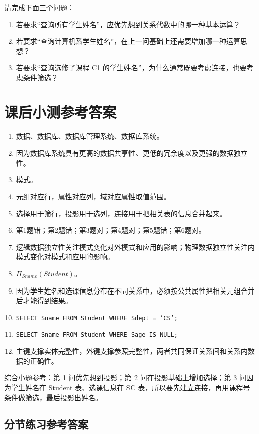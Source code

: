 \documentclass{../../note}
\begin{document}
请完成下面三个问题：

\begin{enumerate}
  \item 若要求“查询所有学生姓名”，应优先想到关系代数中的哪一种基本运算？
  \item 若要求“查询计算机系学生姓名”，在上一问基础上还需要增加哪一种运算思想？
  \item 若要求“查询选修了课程 C1 的学生姓名”，为什么通常既要考虑连接，也要考虑条件筛选？
\end{enumerate}

\section{课后小测参考答案}

\begin{enumerate}
  \item 数据、数据库、数据库管理系统、数据库系统。
  \item 因为数据库系统具有更高的数据共享性、更低的冗余度以及更强的数据独立性。
  \item 模式。
  \item 元组对应行，属性对应列，域对应属性取值范围。
  \item 选择用于筛行，投影用于选列，连接用于把相关表的信息合并起来。
  \item 第1题错；第2题错；第3题对；第4题对；第5题错；第6题对。
  \item 逻辑数据独立性关注模式变化对外模式和应用的影响；物理数据独立性关注内模式变化对模式和应用的影响。
  \item $\Pi_{Sname}(Student)$。
  \item 因为学生姓名和选课信息分布在不同关系中，必须按公共属性把相关元组合并后才能得到结果。
  \item \texttt{SELECT Sname FROM Student WHERE Sdept = 'CS';}
  \item \texttt{SELECT Sname FROM Student WHERE Sage IS NULL;}
  \item 主键支撑实体完整性，外键支撑参照完整性，两者共同保证关系间和关系内数据的正确性。
\end{enumerate}

综合小题参考：第 1 问优先想到投影；第 2 问在投影基础上增加选择；第 3 问因为学生姓名在 Student 表、选课信息在 SC 表，所以要先建立连接，再用课程号条件做筛选，最后投影出姓名。

\subsection{分节练习参考答案}
\end{document}
